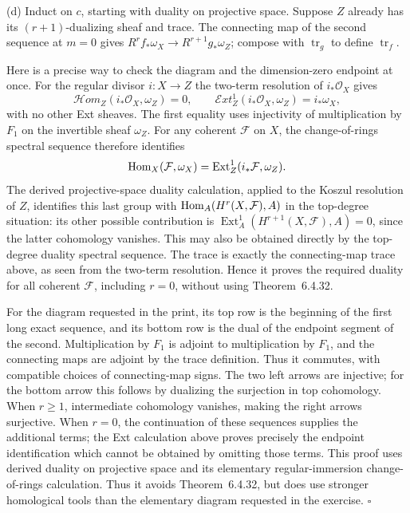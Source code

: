 \documentclass[11pt]{article}
\begin{document}
(d) Induct on $c$, starting with duality on projective space. Suppose $Z$ already has its $(r+1)$-dualizing sheaf and trace. The connecting map of the second sequence at $m=0$ gives $R^rf_*\omega_X\to R^{r+1}g_*\omega_Z$; compose with $\operatorname{tr}_g$ to define $\operatorname{tr}_f$.

Here is a precise way to check the diagram and the dimension-zero endpoint at once. For the regular divisor $i:X\to Z$ the two-term resolution of $i_*\mathcal O_X$ gives
\[ \mathcal H om_Z(i_*\mathcal O_X,\omega_Z)=0,\qquad
\mathcal E xt^1_Z(i_*\mathcal O_X,\omega_Z)=i_*\omega_X, \]
with no other Ext sheaves. The first equality uses injectivity of multiplication by $F_1$ on the invertible sheaf $\omega_Z$. For any coherent $\mathcal F$ on $X$, the change-of-rings spectral sequence therefore identifies
\[ \operatorname{Hom}_X(\mathcal F,\omega_X)=\operatorname{Ext}^1_Z(i_*\mathcal F,\omega_Z). \]
The derived projective-space duality calculation, applied to the Koszul resolution of $Z$, identifies this last group with $\operatorname{Hom}_A(H^r(X,\mathcal F),A)$ in the top-degree situation: its other possible contribution is $\operatorname{Ext}^1_A(H^{r+1}(X,\mathcal F),A)=0$, since the latter cohomology vanishes. This may also be obtained directly by the top-degree duality spectral sequence. The trace is exactly the connecting-map trace above, as seen from the two-term resolution. Hence it proves the required duality for all coherent $\mathcal F$, including $r=0$, without using Theorem~6.4.32.

For the diagram requested in the print, its top row is the beginning of the first long exact sequence, and its bottom row is the dual of the endpoint segment of the second. Multiplication by $F_1$ is adjoint to multiplication by $F_1$, and the connecting maps are adjoint by the trace definition. Thus it commutes, with compatible choices of connecting-map signs. The two left arrows are injective; for the bottom arrow this follows by dualizing the surjection in top cohomology. When $r\ge1$, intermediate cohomology vanishes, making the right arrows surjective. When $r=0$, the continuation of these sequences supplies the additional terms; the Ext calculation above proves precisely the endpoint identification which cannot be obtained by omitting those terms. This proof uses derived duality on projective space and its elementary regular-immersion change-of-rings calculation. Thus it avoids Theorem~6.4.32, but does use stronger homological tools than the elementary diagram requested in the exercise. \hfill$\square$
\end{document}
